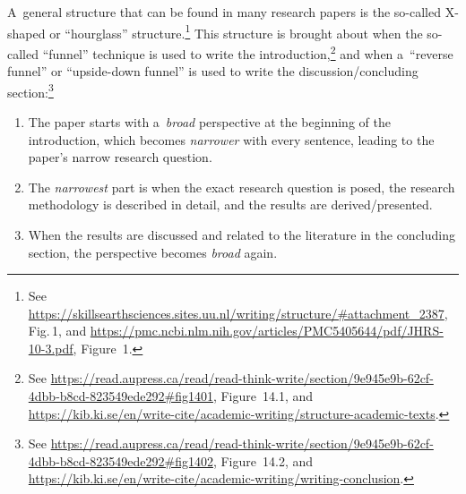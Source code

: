 \documentclass[11pt, a4paper, oneside]{article}
\theoremstyle{Plain}
\theoremstyle{Definition}
\theoremstyle{Remark}
\begin{document}
A~general structure that can be found in many research papers is the so-called X-shaped or ``hourglass'' structure.\footnote{See \url{https://skillsearthsciences.sites.uu.nl/writing/structure/\#attachment_2387}, Fig.\,1, and \url{https://pmc.ncbi.nlm.nih.gov/articles/PMC5405644/pdf/JHRS-10-3.pdf}, Figure~1.} This structure is brought about when the so-called ``funnel'' technique is used to write the introduction,\footnote{See  \url{https://read.aupress.ca/read/read-think-write/section/9e945e9b-62cf-4dbb-b8cd-823549ede292\#fig1401}, Figure~14.1, and \url{https://kib.ki.se/en/write-cite/academic-writing/structure-academic-texts}.} and when a~``reverse funnel'' or ``upside-down funnel'' is used to write the discussion\slash concluding section:\footnote{See \url{https://read.aupress.ca/read/read-think-write/section/9e945e9b-62cf-4dbb-b8cd-823549ede292\#fig1402}, Figure~14.2, and \url{https://kib.ki.se/en/write-cite/academic-writing/writing-conclusion}.}
\begin{enumerate}
	\item The paper starts with a~\emph{broad} perspective at the beginning of the introduction, which becomes \emph{narrower} with every sentence, leading to the paper's narrow research question.
	\item The \emph{narrowest} part is when the exact research question is posed, the research methodology is described in detail, and the results are derived\slash presented.
	\item When the results are discussed and related to the literature in the concluding section, the perspective becomes \emph{broad} again.
\end{enumerate}
\end{document}
